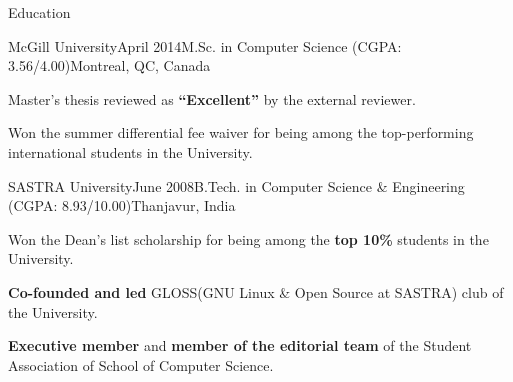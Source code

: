 \documentclass{resume} %
\begin{document}
\begin{rSection}{Education}

\begin{rSubsection}{McGill University}{April 2014}{M.Sc. in
Computer Science (CGPA: 3.56/4.00)}{Montreal, QC, Canada} 
\item Master's thesis reviewed as \textbf{``Excellent''} by the external
reviewer.
\item Won the {summer differential fee waiver} for being among the
top-performing international students in the University.  
\end{rSubsection}

\begin{rSubsection}{SASTRA University}{June 2008}{B.Tech. in Computer Science
\& Engineering (CGPA: 8.93/10.00)}{Thanjavur, India} 
\item Won the {Dean's list scholarship} for being among the \textbf{top
10\%} students in the University. 
\item \textbf{Co-founded and led} GLOSS(GNU Linux \& Open Source at SASTRA)
club of the University.  
\item \textbf{Executive member} and \textbf{member of the editorial team} of
the Student Association of School of Computer Science. 
\end{rSubsection}

\end{rSection}
\end{document}
